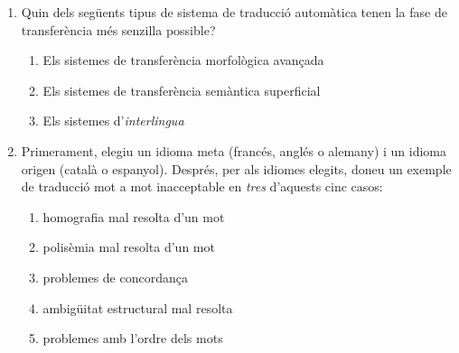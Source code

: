 \begin{enumerate}
\item Quin dels següents tipus de sistema de traducció automàtica
  tenen la fase de transferència més senzilla possible?
  \begin{enumerate}
  \item Els sistemes de transferència morfològica avançada
  \item Els sistemes de transferència semàntica superficial
  \item Els sistemes d'\emph{interlingua}
  \end{enumerate}

\item Primerament, elegiu un idioma meta (francés, anglés o alemany) i
  un idioma origen (català o espanyol). Després, per als idiomes
  elegits, doneu un exemple de traducció mot a mot inacceptable en
  \emph{tres} d'aquests cinc casos:
  \begin{enumerate}
  \item homografia mal resolta d'un mot
  \item polisèmia mal resolta d'un mot
  \item problemes de concordança
  \item ambigüitat estructural mal resolta
  \item problemes amb l'ordre dels mots
  \end{enumerate}
      

\end{enumerate}

